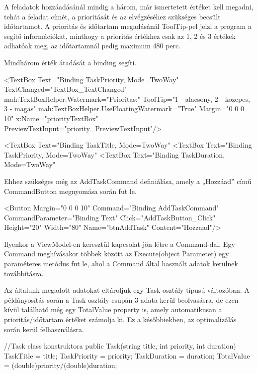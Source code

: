 

A feladatok hozzáadásánál mindig a három, már ismertetett értéket kell megadni, tehát a feladat címét, a prioritását és az elvégzéséhez szükséges becsült időtartamot. A prioritás és időtartam megadásánál ToolTip-pel jelzi a program a segítő információkat, minthogy a prioritás értékhez csak az 1, 2 és 3 értékek adhatóak meg, az időtartamnál pedig maximum 480 perc.

Mindhárom érték átadását a binding segíti.

\begin{java}
<TextBox Text="{Binding TaskPriority, Mode=TwoWay}"
TextChanged="TextBox_TextChanged"
mah:TextBoxHelper.Watermark="Prioritas:"
ToolTip="1 - alacsony, 2 - kozepes, 3 - magas"
mah:TextBoxHelper.UseFloatingWatermark="True"
Margin="0 0 0 10"
x:Name="priorityTextBox"
PreviewTextInput="priority_PreviewTextInput"/>
\end{java}


\begin{java}
<TextBox Text="{Binding TaskTitle, Mode=TwoWay}"
<TextBox Text="{Binding TaskPriority, Mode=TwoWay}"
<TextBox Text="{Binding TaskDuration, Mode=TwoWay}"
\end{java}

Ehhez szükséges még az AddTaskCommand definiálása, amely a „Hozzáad” című CommandButton megnyomása során fut le.

\begin{java}
<Button 
Margin="0 0 0 10"
Command="{Binding AddTaskCommand}"
CommandParameter="{Binding Text}"
Click="AddTaskButton_Click"
Height="20" Width="80"
Name="btnAddTask"
Content="Hozzaad"/>	
\end{java}

Ilyenkor a ViewModel-en keresztül kapcsolat jön létre a Command-dal. Egy Command meghívásakor többek között az Execute(object Parameter) egy paraméteres metódus fut le, ahol a Command által használt adatok kerülnek továbbításra.

Az általunk megadott adatokat eltároljuk egy Task osztály típusú változóban. A példányosítás során a Task osztály csupán 3 adata kerül beolvasásra, de ezen kívül található még egy TotalValue property is, amely automatikusan a prioritás/időtartam értéket számolja ki. Ez a későbbiekben, az optimalizálás során kerül felhasználásra.

\begin{java}
//Task class konstruktora
public Task(string title, int priority, int duration)
{
	TaskTitle = title;
	TaskPriority = priority;
	TaskDuration = duration;
	TotalValue = (double)priority/(double)duration;
}	
\end{java}

